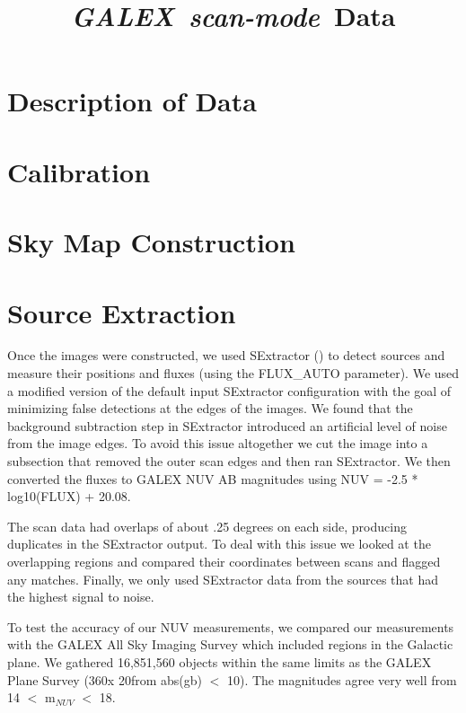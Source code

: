 \documentclass[12pt, preprint]{aastex}
\begin{document}
\newcommand{\project}[1]{\textsl{#1}} 
\newcommand{\galex}{\project{GALEX}}
\newcommand{\scanmode}{\project{scan-mode}}

\title{\galex\ \scanmode\ Data}
\author{}

\section{Description of Data}

\section{Calibration}

\section{Sky Map Construction}

\section{Source Extraction}
Once the images were constructed, we used SExtractor (\cite{sextractor}) to detect sources and measure their positions and fluxes (using the FLUX\_AUTO parameter). We used a modified version of the default input SExtractor configuration with the goal of minimizing false detections at the edges of the images. We found that the background subtraction step in SExtractor introduced an artificial level of noise from the image edges. To avoid this issue altogether we cut the image into a subsection that removed the outer scan edges and then ran SExtractor. We then converted the fluxes to GALEX NUV AB magnitudes using NUV = -2.5 * log10(FLUX) + 20.08.

The scan data had overlaps of about .25 degrees on each side, producing duplicates in the SExtractor output. To deal with this issue we looked at the overlapping regions and compared their coordinates between scans and flagged any matches. Finally, we only used SExtractor data from the sources that had the highest signal to noise.

To test the accuracy of our NUV measurements, we compared our measurements with the GALEX All Sky Imaging Survey which included regions in the Galactic plane. We gathered 16,851,560 objects within the same limits as the GALEX Plane Survey (360\deg x 20\deg from abs(gb) $<$ 10). The magnitudes agree very well from 14 $<$ m$_{NUV}$ $<$ 18. 
\end{document}
